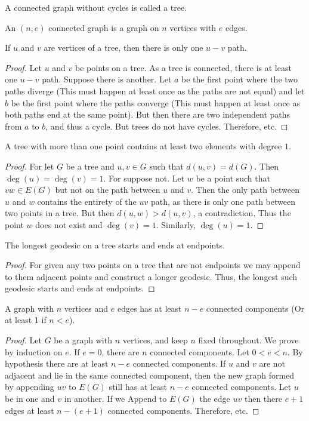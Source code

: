 \documentclass[crop=false,class=book,oneside]{standalone}
\begin{document}
\begin{definition}
A connected graph without cycles is called a tree.
\end{definition}
\begin{definition}
An $(n,e)$ connected graph is a graph on $n$ vertices with $e$ edges.
\end{definition}
\begin{theorem}
If $u$ and $v$ are vertices of a tree, then there is only one $u-v$ path.
\end{theorem}
\begin{proof}
Let $u$ and $v$ be points on a tree. As a tree is connected, there is at least one $u-v$ path. Suppose there is another. Let $a$ be the first point where the two paths diverge (This must happen at least once as the paths are not equal) and let $b$ be the first point where the paths converge (This must happen at least once as both paths end at the same point). But then there are two independent paths from $a$ to $b$, and thus a cycle. But trees do not have cycles. Therefore, etc.
\end{proof}
\begin{corollary}
A tree with more than one point contains at least two elements with degree $1$.
\end{corollary}
\begin{proof}
For let $G$ be a tree and $u,v\in G$ such that $d(u,v) = d(G)$. Then $\deg(u) = \deg(v) = 1$. For suppose not. Let $w$ be a point such that $vw\in E(G)$ but not on the path between $u$ and $v$. Then the only path between $u$ and $w$ contains the entirety of the $uv$ path, as there is only one path between two points in a tree. But then $d(u,w)>d(u,v)$, a contradiction. Thus the point $w$ does not exist and $\deg(v)=1$. Similarly, $\deg(u)=1$.
\end{proof}
\begin{corollary}
The longest geodesic on a tree starts and ends at endpoints.
\end{corollary}
\begin{proof}
For given any two points on a tree that are not endpoints we may append to them adjacent points and construct a longer geodesic. Thus, the longest such geodesic starts and ends at endpoints.
\end{proof}
\begin{lemma}
A graph with $n$ vertices and $e$ edges has at least $n-e$ connected components (Or at least 1 if $n<e$).
\end{lemma}
\begin{proof}
Let $G$ be a graph with $n$ vertices, and keep $n$ fixed throughout. We prove by induction on $e$. If $e=0$, there are $n$ connected components. Let $0<e < n$. By hypothesis there are at least $n-e$ connected components. If $u$ and $v$ are not adjacent and lie in the same connected component, then the new graph formed by appending $uv$ to $E(G)$ still has at least $n-e$ connected components. Let $u$ be in one and $v$ in another. If we Append to $E(G)$ the edge $uv$ then there $e+1$ edges at least $n-(e+1)$ connected components. Therefore, etc.
\end{proof}
\end{document}
